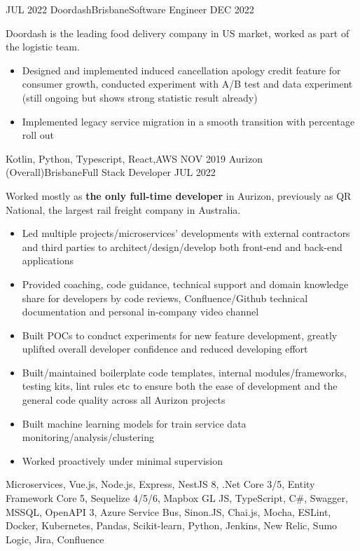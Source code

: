 \begin{experiences}
    \emptySeparator
    \experience 
    {JUL 2022}   {Doordash}{Brisbane}{Software Engineer}
    {DEC 2022} {
                    Doordash is the leading food delivery company in US market, worked as part of the logistic team.
                    \begin{itemize}
                        \item Designed and implemented induced cancellation apology credit feature for consumer growth, conducted experiment with A/B test and data experiment (still ongoing but shows strong statistic result already)
                        \item Implemented legacy service migration in a smooth transition with percentage roll out 
                  \end{itemize}
                    }
                    {Kotlin, Python, Typescript, React,AWS}
    \emptySeparator
    \experience
    {NOV 2019}   {Aurizon (Overall)}{Brisbane}{Full Stack Developer}
    {JUL 2022} {
                    Worked mostly as \textbf{the only full-time developer} in Aurizon, previously as QR National, the largest rail freight company in Australia.
                      \begin{itemize}
                        \item Led multiple projects/microservices' developments with external contractors and third parties to architect/design/develop both front-end and back-end applications
                        \item Provided coaching, code guidance, technical support and domain knowledge share for developers by code reviews, Confluence/Github technical documentation and personal in-company video channel 
                        \item Built POCs to conduct experiments for new feature development, greatly uplifted overall developer confidence and reduced developing effort
                        \item Built/maintained boilerplate code templates, internal modules/frameworks, testing kits, lint rules etc to ensure both the ease of development and the general code quality across all Aurizon projects
                        \item Built machine learning models for train service data monitoring/analysis/clustering
                        \item Worked proactively under minimal supervision
                      \end{itemize}
                    }
                    {Microservices, Vue.js, Node.js, Express, NestJS 8, .Net Core 3/5, Entity Framework Core 5, Sequelize 4/5/6, Mapbox GL JS, TypeScript, C\#, Swagger, MSSQL, OpenAPI 3, Azure Service Bus, Sinon.JS, Chai.js, Mocha, ESLint, Docker, Kubernetes, Pandas, Scikit-learn, Python, Jenkins, New Relic, Sumo Logic, Jira, Confluence}

\end{experiences}
